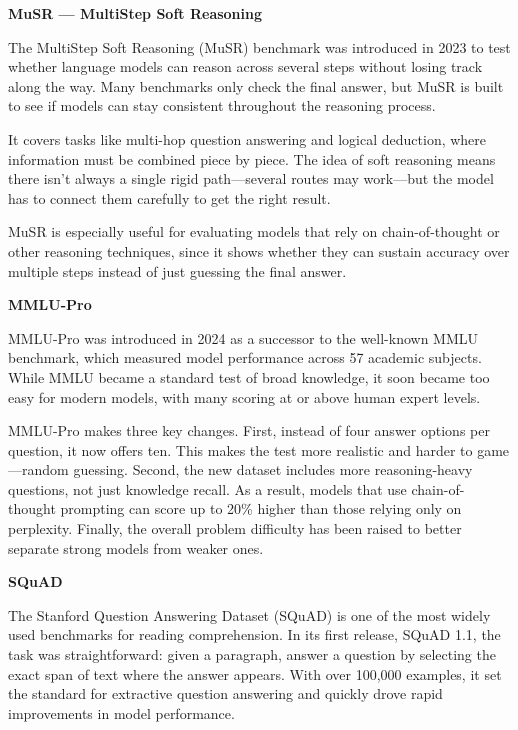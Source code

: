 \textbf{MuSR — MultiStep Soft Reasoning}


The MultiStep Soft Reasoning (MuSR) benchmark was introduced in 2023 to test whether language models can reason across several steps without
losing track along the way. Many benchmarks only check the final answer, but MuSR is built to see if models can stay consistent throughout the
reasoning process.

It covers tasks like multi-hop question answering and logical deduction, where information must be combined piece by piece. The idea of soft
reasoning means there isn’t always a single rigid path—several routes may work—but the model has to connect them carefully to get the right result.

MuSR is especially useful for evaluating models that rely on chain-of-thought or other reasoning techniques, since it shows whether
they can sustain accuracy over multiple steps instead of just guessing the final answer.

\textbf{MMLU-Pro}


MMLU-Pro was introduced in 2024 as a successor to the well-known MMLU benchmark, which measured model performance across 57 academic subjects.
While MMLU became a standard test of broad knowledge, it soon became too easy for modern models, with many scoring at or above human expert levels.

MMLU-Pro makes three key changes. First, instead of four answer options per question, it now offers ten. This makes the test more realistic and
harder to game—random guessing. Second, the new dataset includes more reasoning-heavy questions, not just knowledge recall.
As a result, models that use chain-of-thought prompting can score up to 20\% higher than those relying only on perplexity. 
Finally, the overall problem difficulty has been raised to better separate strong models from weaker ones.

\textbf{SQuAD}


The Stanford Question Answering Dataset (SQuAD) is one of the most widely used benchmarks for reading comprehension. In its first release,
SQuAD 1.1, the task was straightforward: given a paragraph, answer a question by selecting the exact span of text where the answer appears.
With over 100,000 examples, it set the standard for extractive question answering and quickly drove rapid improvements in model performance.

